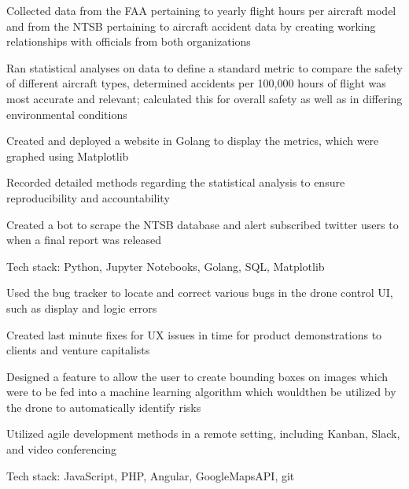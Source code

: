 \documentclass[letterpaper]{resume}
\begin{document}
\begin{compactitem}
\item Collected data from the FAA pertaining to yearly flight hours per aircraft model and from the NTSB pertaining to aircraft accident data by creating working relationships with officials from both organizations
\item Ran statistical analyses on data to define a standard metric to compare the safety of different aircraft types, determined accidents per 100,000 hours of flight was most accurate and relevant; calculated this for overall safety as well as in differing environmental conditions
\item Created and deployed a website in Golang to display the metrics, which were graphed using Matplotlib
\item Recorded detailed methods regarding the statistical analysis to ensure reproducibility and accountability
\item Created a bot to scrape the NTSB database and alert subscribed twitter users to when a final report was released
\item Tech stack: Python, Jupyter Notebooks, Golang, SQL, Matplotlib
\end{compactitem}

\begin{compactitem}
\item Used the bug tracker to locate and correct various bugs in the drone control UI, such as display and logic errors
\item Created last minute fixes for UX issues in time for product demonstrations to clients and venture capitalists
\item Designed a feature to allow the user to create bounding boxes on images which were to be fed into a machine learning algorithm which wouldthen be utilized by the drone to automatically identify risks
\item Utilized agile development methods in a remote setting, including Kanban, Slack, and video conferencing
\item Tech stack: JavaScript, PHP, Angular, GoogleMapsAPI, git
\end{compactitem}

\end{document}
